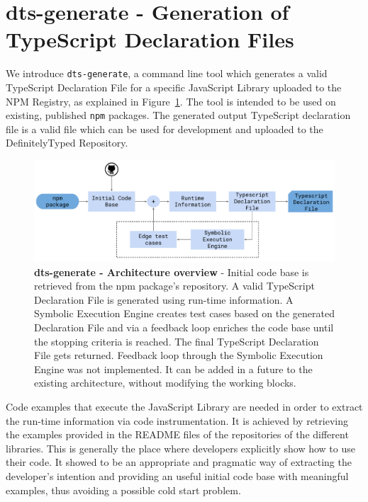\documentclass[a4paper,english,cleveref, autoref]{lipics-v2019}
\newcommand{\figref}[1]{Figure~\ref{#1}}
\begin{document}
\section{dts-generate - Generation of TypeScript Declaration Files}
We introduce \lstinline{dts-generate}, a command line tool which generates a valid TypeScript Declaration File for a specific JavaScript Library uploaded to the NPM Registry, as explained in \figref{fig:tsd_generation_method_block_diagram}. The tool is intended to be used on existing, published \lstinline{npm} packages. The generated output TypeScript declaration file is a valid file which can be used for development and uploaded to the DefinitelyTyped Repository.

\begin{figure}[tp]
    \centering
    \includegraphics[width=1\linewidth]{dts-generate-block-diagram.pdf}
    \caption[dts-generate - Architecture overview]{\textbf{dts-generate - Architecture overview} - Initial code base is retrieved from the npm package's repository. A valid TypeScript Declaration File is generated using run-time information. A Symbolic Execution Engine creates test cases based on the generated Declaration File and via a feedback loop enriches the code base until the stopping criteria is reached. The final TypeScript Declaration File gets returned. Feedback loop through the Symbolic Execution Engine was not implemented. It can be added in a future to the existing architecture, without modifying the working blocks.}
    \label{fig:tsd_generation_method_block_diagram}
  \end{figure}

Code examples that execute the JavaScript Library are needed in order to extract the run-time information via code instrumentation. It is achieved by retrieving the examples provided in the README files of the repositories of the different libraries. This is generally the place where developers explicitly show how to use their code. It showed to be an appropriate and pragmatic way of extracting the developer's intention and providing an useful initial code base with meaningful examples, thus avoiding a possible cold start problem. 
\end{document}
